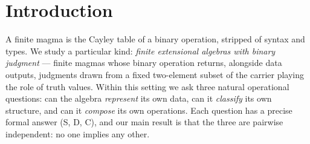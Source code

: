 %
%
%

\section{Introduction}
\label{sec:introduction}

A finite magma is the Cayley table of a binary operation, stripped of
syntax and types. We study a particular kind: \emph{finite extensional
algebras with binary judgment} --- finite magmas whose binary operation
returns, alongside data outputs, judgments drawn from a fixed two-element
subset of the carrier playing the role of truth values. Within this
setting we ask three natural operational questions: can the algebra
\emph{represent} its own data, can it \emph{classify} its own structure,
and can it \emph{compose} its own operations. Each question has a precise
formal answer (S, D, C), and our main result is that the three are
pairwise independent: no one implies any other.


